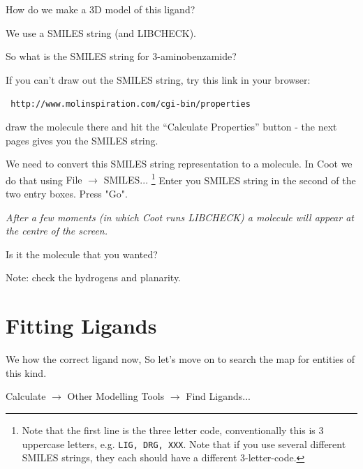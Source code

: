 \documentclass{article}
\begin{document}
\begin{trivlist}
\item  How do we make a 3D model of this ligand?

\textsf{We use a SMILES string (and LIBCHECK).}
\end{trivlist}


\begin{trivlist}
\item So what is the SMILES string for 3-aminobenzamide?
\end{trivlist}


 If you can't draw out the SMILES string, try this link in your browser:

\texttt{ http://www.molinspiration.com/cgi-bin/properties}
\begin{trivlist}
\item  draw the molecule there and hit the ``Calculate Properties'' button - the
 next pages gives you the SMILES string.

\end{trivlist}

We need to convert this SMILES string representation to a molecule.
In Coot we do that using \textsf{File $\rightarrow$ SMILES...}
\footnote{ Note that the first line is the three letter code,
  conventionally this is 3 uppercase letters, e.g. \texttt{LIG, DRG,
    XXX}.  Note that if you use several different SMILES strings, they
  each should have a different 3-letter-code.} Enter you SMILES string
in the second of the two entry boxes. Press "Go".

\textsl{ After a few moments (in which Coot runs LIBCHECK) a molecule
  will appear at the centre of the screen.}

 \begin{trivlist}
 \item Is it the molecule that you wanted?  

 \textsf{Note: check the hydrogens and planarity.}
 \end{trivlist}


\section{Fitting Ligands}

We how the correct ligand now, So let's move on to search the map for
entities of this kind.

 \textsf{Calculate $\rightarrow$ Other Modelling Tools $\rightarrow$ Find Ligands...}
\end{document}
